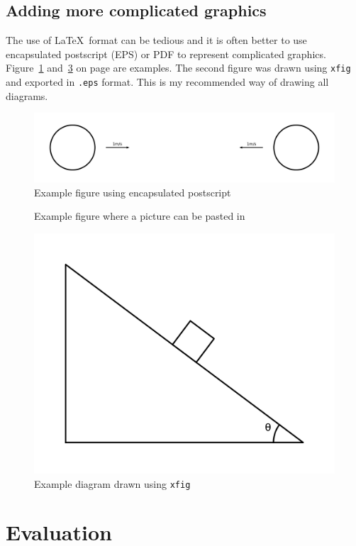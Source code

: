 \documentclass[12pt,a4paper,twoside,openright]{report}
\begin{document}
\section{Adding more complicated graphics}
The use of \LaTeX\ format can be tedious and it is often better to use
encapsulated postscript (EPS) or PDF to represent complicated graphics.
Figure~\ref{epsfig} and~\ref{xfig} on page \pageref{xfig} are
examples. The second figure was drawn using \texttt{xfig} and exported in
{\tt.eps} format. This is my recommended way of drawing all diagrams.
\begin{figure}[tbh]
\centerline{\includegraphics{figs/img1.png}}
\caption{Example figure using encapsulated postscript}
\label{epsfig}
\end{figure}
\begin{figure}[tbh]
\vspace{4in}
\caption{Example figure where a picture can be pasted in}
\label{pastedfig}
\end{figure}
\begin{figure}[tbh]
\centerline{\includegraphics{figs/img2.png}}
\caption{Example diagram drawn using \texttt{xfig}}
\label{xfig}
\end{figure}
\chapter{Evaluation}
\end{document}
